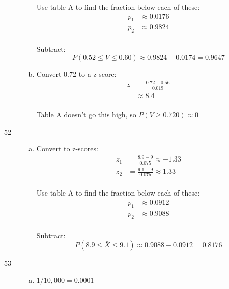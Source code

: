 \documentclass[letterpaper, landscape]{exam}
\begin{document}
\begin{description}
\begin{enumerate}[(a)]
            Use table A to find the fraction below each of these:
            \begin{align*}
              p_1 &\approx 0.0176 \\
              p_2 &\approx 0.9824 \\
            \end{align*}

            Subtract:
            \[
              P(0.52 \leq V \leq 0.60) \approx 0.9824 - 0.0174 = \boxed{ 0.9647 }
            \]

          \item Convert 0.72 to a z-score:
            \begin{align*}
              z & = \frac{0.72 - 0.56}{0.019} \\
                & \approx 8.4 \\
            \end{align*}

            Table A doesn't go this high, so $P(V \geq 0.720) \approx 0$
        \end{enumerate}  

      \item[52]
        \begin{enumerate}[(a)]
          \item Convert to z-scores:
            \begin{align*}
              z_1 & = \frac{8.9 - 9}{0.075} \approx -1.33 \\
              z_2 & = \frac{9.1 - 9}{0.075} \approx 1.33 \\
            \end{align*}

            Use table A to find the fraction below each of these:
            \begin{align*}
              p_1 &\approx 0.0912 \\
              p_2 &\approx 0.9088 \\
            \end{align*}

            Subtract:
            \[
              P(8.9 \leq \bar{X} \leq 9.1) \approx 0.9088 - 0.0912 = \boxed{ 0.8176 }
            \]
          \end{enumerate}

        \item[53]
          \begin{enumerate}[(a)]
            \item $1/10,000 = \boxed{ 0.0001 }$


\end{enumerate}
\end{description}
\end{document}
